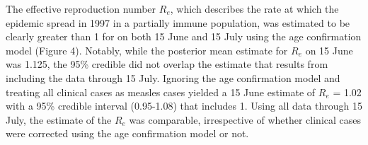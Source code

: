 The effective reproduction number $R_e$, which describes the rate at which the epidemic spread in 1997 in a partially immune population, was estimated to be clearly greater than 1 for on both 15 June and 15 July using the age confirmation model (Figure 4). Notably, while the posterior mean estimate for $R_e$ on 15 June was 1.125, the 95\% credible did not overlap the estimate that results from including the data through 15 July. Ignoring the age
confirmation model and treating all clinical cases as measles cases yielded a 15 June estimate of $R_e$ = 1.02 with a 95\% credible interval
(0.95-1.08) that includes 1. Using all data through 15 July, the estimate of the $R_e$ was comparable, irrespective of whether clinical cases were corrected using the age confirmation model or not.